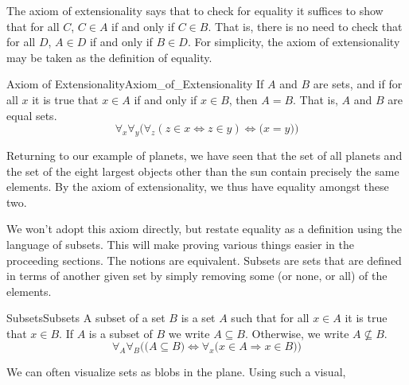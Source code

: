         The axiom of extensionality says that to check for equality it suffices
        to show that for all $C$, $C\in{A}$ if and only if $C\in{B}$.
        That is, there is no need to check that for all $D$, $A\in{D}$ if and
        only if $B\in{D}$. For simplicity, the axiom of extensionality may be
        taken as the definition of equality.
        \begin{faxiom}{Axiom of Extensionality}{Axiom_of_Extensionality}
            If $A$ and $B$ are sets, and if for all $x$ it is true that
            $x\in{A}$ if and only if $x\in{B}$, then $A=B$. That is, $A$ and $B$
            are equal sets.
            \begin{equation*}
                \forall_{x}\forall_{y}\Big(\forall_{z}(z\in{x}\Leftrightarrow
                z\in{y})\Longleftrightarrow\big(x=y\big)\Big)
            \end{equation*}
        \end{faxiom}
        \begin{example}
            Returning to our example of planets, we have seen that the set of
            all planets and the set of the eight largest objects other than the
            sun contain precisely the same elements. By the axiom of
            extensionality, we thus have equality amongst these two.
        \end{example}
        We won't adopt this axiom directly, but restate equality as a definition
        using the language of subsets. This will make proving
        various things easier in the proceeding sections. The notions are
        equivalent. Subsets are sets that are defined in terms of another given
        set by simply removing some (or none, or all) of the elements.
        \begin{fdefinition}{Subsets}{Subsets}
            A \gls{subset} of a \gls{set} $B$ is a set $A$ such that for all
            $x\in{A}$ it is true that $x\in{B}$. If $A$ is a subset of $B$ we
            write $A\subseteq{B}$. Otherwise, we write $A\nsubseteq{B}$.
            \begin{equation*}
                \forall_{A}\forall_{B}\Big(\big(A\subseteq{B}\big)
                \Longleftrightarrow
                \forall_{x}\big(x\in{A}\Rightarrow{x}\in{B}\big)\Big)
            \end{equation*}
        \end{fdefinition}
        We can often visualize sets as blobs in the plane. Using such a visual,
